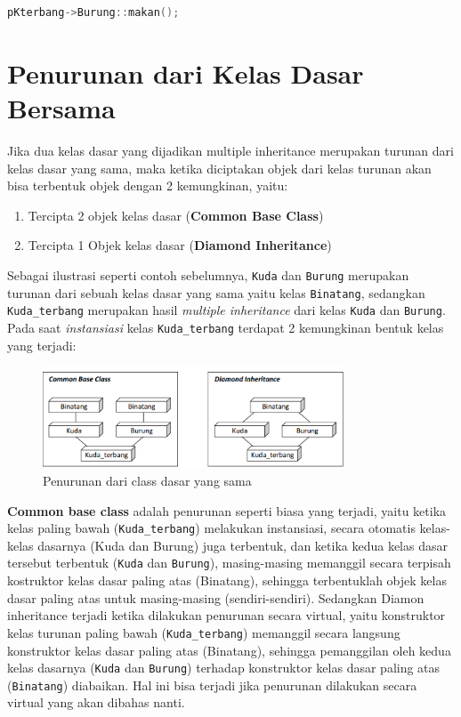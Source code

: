 \begin{lstlisting}[language=c++, numbers=none]
pKterbang->Burung::makan();
\end{lstlisting}

\section{Penurunan dari Kelas Dasar
Bersama}\label{penurunan-dari-kelas-dasar-bersama}

Jika dua kelas dasar yang dijadikan multiple inheritance merupakan
turunan dari kelas dasar yang sama, maka ketika diciptakan objek dari
kelas turunan akan bisa terbentuk objek dengan 2 kemungkinan, yaitu:

\begin{enumerate}


\item
  Tercipta 2 objek kelas dasar (\textbf{Common Base Class})
\item
  Tercipta 1 Objek kelas dasar (\textbf{Diamond Inheritance})
\end{enumerate}

Sebagai ilustrasi seperti contoh sebelumnya, \texttt{Kuda} dan
\texttt{Burung} merupakan turunan dari sebuah kelas dasar yang sama
yaitu kelas \texttt{Binatang}, sedangkan \texttt{Kuda\_terbang}
merupakan hasil \emph{multiple inheritance} dari kelas \texttt{Kuda} dan
\texttt{Burung}. Pada saat \emph{instansiasi} kelas
\texttt{Kuda\_terbang} terdapat 2 kemungkinan bentuk kelas yang terjadi:

\begin{figure}[htbp]
\centering
\includegraphics[width=0.8\textwidth]{../manuscript/images/capture9-3}
\caption{Penurunan dari class dasar yang sama}
\end{figure}

\textbf{Common base class} adalah penurunan seperti biasa yang terjadi,
yaitu ketika kelas paling bawah (\texttt{Kuda\_terbang}) melakukan
instansiasi, secara otomatis kelas-kelas dasarnya (Kuda dan Burung) juga
terbentuk, dan ketika kedua kelas dasar tersebut terbentuk
(\texttt{Kuda} dan \texttt{Burung}), masing-masing memanggil secara
terpisah kostruktor kelas dasar paling atas (Binatang), sehingga
terbentuklah objek kelas dasar paling atas untuk masing-masing
(sendiri-sendiri). Sedangkan Diamon inheritance terjadi ketika dilakukan
penurunan secara virtual, yaitu konstruktor kelas turunan paling bawah
(\texttt{Kuda\_terbang}) memanggil secara langsung konstruktor kelas
dasar paling atas (Binatang), sehingga pemanggilan oleh kedua kelas
dasarnya (\texttt{Kuda} dan \texttt{Burung}) terhadap konstruktor kelas
dasar paling atas (\texttt{Binatang}) diabaikan. Hal ini bisa terjadi
jika penurunan dilakukan secara virtual yang akan dibahas nanti.

